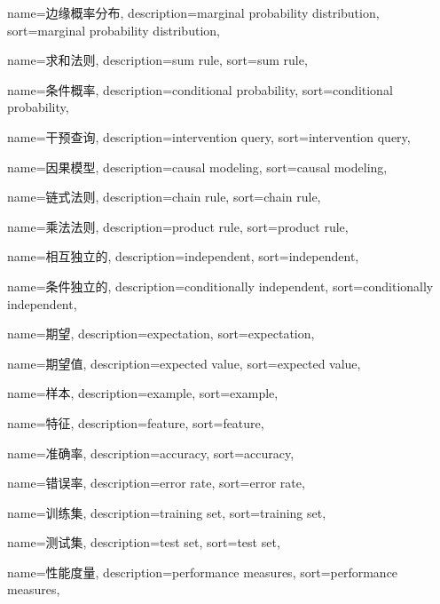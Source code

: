 {
  name=边缘概率分布,
  description={marginal probability distribution},
  sort={marginal probability distribution},
}

{
  name=求和法则,
  description={sum rule},
  sort={sum rule},
}

{
  name=条件概率,
  description={conditional probability},
  sort={conditional probability},
}

{
  name=干预查询,
  description={intervention query},
  sort={intervention query},
}

{
  name=因果模型,
  description={causal modeling},
  sort={causal modeling},
}

{
  name=链式法则,
  description={chain rule},
  sort={chain rule},
}

{
  name=乘法法则,
  description={product rule},
  sort={product rule},
}

{
  name=相互独立的,
  description={independent},
  sort={independent},
}

{
  name=条件独立的,
  description={conditionally independent},
  sort={conditionally independent},
}

{
  name=期望,
  description={expectation},
  sort={expectation},
}

{
  name=期望值,
  description={expected value},
  sort={expected value},
}

{
  name=样本,
  description={example},
  sort={example},
}

{
  name=特征,
  description={feature},
  sort={feature},
}

{
  name=准确率,
  description={accuracy},
  sort={accuracy},
}

{
  name=错误率,
  description={error rate},
  sort={error rate},
}

{
  name=训练集,
  description={training set},
  sort={training set},
}

{
  name=测试集,
  description={test set},
  sort={test set},
}

{
  name=性能度量,
  description={performance measures},
  sort={performance measures},
}


